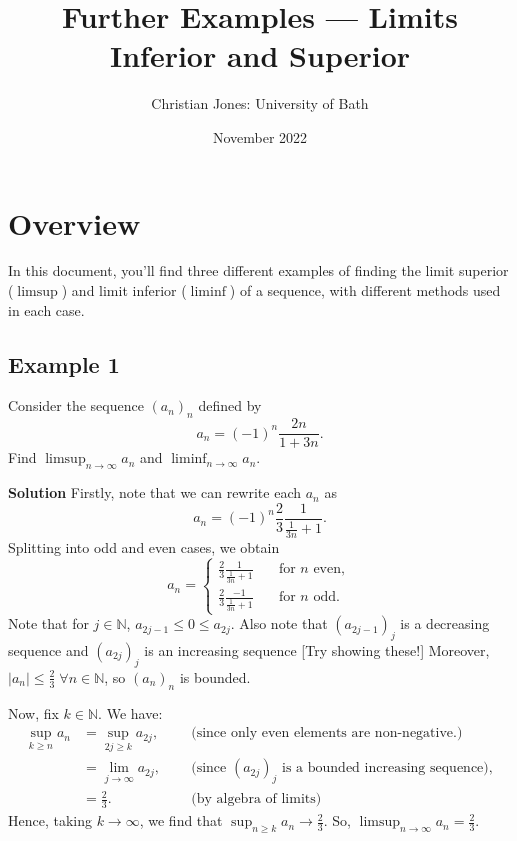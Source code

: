 \documentclass[
  10pt,
  a4paper]{article}
\title{Further Examples --- Limits Inferior and Superior}
\author{Christian Jones: University of Bath}
\date{November 2022}
\theoremstyle{plain}
\theoremstyle{definition}
\theoremstyle{plain}
\theoremstyle{plain}
\theoremstyle{plain}
\theoremstyle{plain}
\theoremstyle{definition}
\theoremstyle{definition}
\theoremstyle{remark}
\theoremstyle{remark}
\let\BeginKnitrBlock\begin \let\EndKnitrBlock\end
\begin{document}
\maketitle

{
\setcounter{tocdepth}{2}
\tableofcontents
}
\newpage
{}

\hypertarget{overview}{%
\section*{Overview}\label{overview}}

In this document, you'll find three different examples of finding the limit superior (\(\limsup\)) and limit inferior (\(\liminf\)) of a sequence, with different methods used in each case.

\hypertarget{example-1}{%
\subsection*{Example 1}\label{example-1}}

\BeginKnitrBlock{example}
{\label{exm:ex1} }Consider the sequence \((a_n)_{n}\) defined by \[a_n = (-1)^n\frac{2n}{1+3n}.\] Find \(\limsup_{n \to \infty} a_n\) and \(\liminf_{n \to \infty} a_n\).
\EndKnitrBlock{example}

\textbf{Solution}
Firstly, note that we can rewrite each \(a_n\) as \[a_n = (-1)^n \frac{2}{3}\frac{1}{\frac{1}{3n} + 1}.\] Splitting into odd and even cases, we obtain \[a_n = \begin{cases} \frac{2}{3}\frac{1}{\frac{1}{3n} + 1} &\quad \text{for $n$ even},\\
\frac{2}{3}\frac{-1}{\frac{1}{3n} + 1} &\quad \text{for $n$ odd}.\end{cases}\] Note that for \(j \in \mathbb{N}\), \(a_{2j-1} \leq 0 \leq a_{2j}\). Also note that \((a_{2j-1})_j\) is a decreasing sequence and \((a_{2j})_{j}\) is an increasing sequence {[}Try showing these!{]} Moreover, \(\lvert a_n \rvert \leq \frac{2}{3} \; \forall n\in\mathbb{N}\), so \((a_n)_n\) is bounded.

Now, fix \(k \in \mathbb{N}\). We have:
\begin{align*}
\sup_{k\geq n}a_n &= \sup_{2j \geq k} a_{2j}, \; \; &&\text{(since only even elements are non-negative.)}\\
&= \lim_{j \to \infty} a_{2j}, \; \; &&\text{(since $(a_{2j})_j$ is a bounded increasing sequence)},\\
&= \frac{2}{3}. \; \; \quad &&\text{(by algebra of limits)}
\end{align*}
Hence, taking \(k \to \infty\), we find that \(\sup_{n \geq k} a_n \to \frac{2}{3}\). So, \(\limsup_{n \to \infty} a_n = \frac{2}{3}\).
\end{document}
